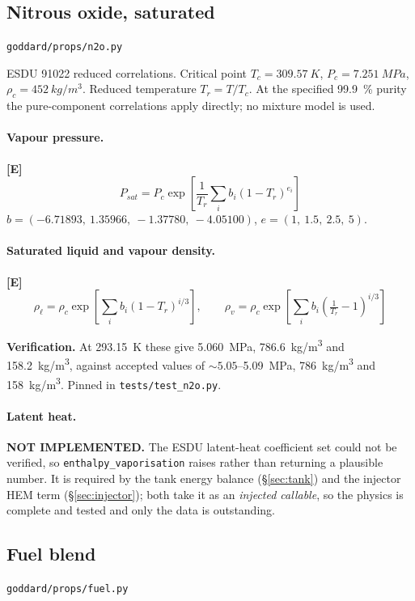 \documentclass[11pt,a4paper]{article}
\newcommand{\established}{\textcolor{okgreen}{\textbf{[E]}}\xspace}
\newcommand{\src}[1]{\hfill{\footnotesize\texttt{#1}}}
\begin{document}
\subsection{Nitrous oxide, saturated}
\src{goddard/props/n2o.py}

ESDU 91022 reduced correlations. Critical point $T_c = \SI{309.57}{K}$,
$P_c = \SI{7.251}{MPa}$, $\rho_c = \SI{452}{kg/m^3}$. Reduced temperature
$T_r = T/T_c$. At the specified \SI{99.9}{\percent} purity the pure-component
correlations apply directly; no mixture model is used.

\paragraph{Vapour pressure.} \established
\begin{equation}
P_{sat} = P_c \exp\!\left[\frac{1}{T_r}\sum_{i} b_i (1-T_r)^{e_i}\right]
\end{equation}
$b = (-6.71893,\ 1.35966,\ -1.37780,\ -4.05100)$,
$e = (1,\ 1.5,\ 2.5,\ 5)$.

\paragraph{Saturated liquid and vapour density.} \established
\begin{equation}
\rho_\ell = \rho_c \exp\!\left[\sum_i b_i (1-T_r)^{i/3}\right], \qquad
\rho_v    = \rho_c \exp\!\left[\sum_i b_i \left(\tfrac{1}{T_r}-1\right)^{i/3}\right]
\end{equation}

\noindent\textbf{Verification.} At \SI{293.15}{K} these give
\SI{5.060}{MPa}, \SI{786.6}{kg/m^3} and \SI{158.2}{kg/m^3}, against accepted
values of ${\sim}5.05$--\SI{5.09}{MPa}, \SI{786}{kg/m^3} and
\SI{158}{kg/m^3}. Pinned in \texttt{tests/test\_n2o.py}.

\paragraph{Latent heat.} \textbf{NOT IMPLEMENTED.}
The ESDU latent-heat coefficient set could not be verified, so
\texttt{enthalpy\_vaporisation} raises rather than returning a plausible
number. It is required by the tank energy balance
(\S\ref{sec:tank}) and the injector HEM term (\S\ref{sec:injector}); both take
it as an \emph{injected callable}, so the physics is complete and tested and
only the data is outstanding.

\subsection{Fuel blend}
\src{goddard/props/fuel.py}
\end{document}
